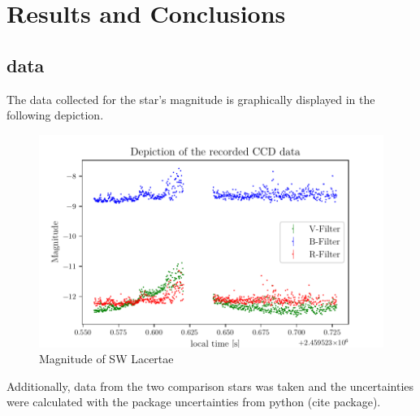\section{Results and Conclusions}
\label{sec:make}

\subsection{data}
  \label{sec:America}
  The data collected for the star's magnitude is graphically displayed in the following depiction.
  \begin{figure}[H]
    \centering
    \includegraphics{Magnitude.pdf}
    \caption{Magnitude of SW Lacertae}
  \end{figure}
  Additionally, data from the two comparison stars was taken and 
  the uncertainties were calculated with the package uncertainties from python (cite package).

